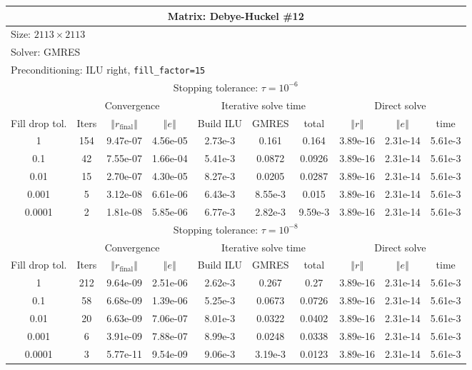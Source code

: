 \documentclass[oneside,final]{amsart}  %
\begin{document}
\begin{tabular}{|c|c|c|c|c|c|c|c|c|c|}
\hline
\multicolumn{10}{|c|}{Matrix: Debye-Huckel \#12}\tabularnewline
\hline
  \multicolumn{10}{|l|}{Size: $2113\times2113$}\tabularnewline
\hline
\multicolumn{10}{|l|}{Solver: GMRES}\tabularnewline
\hline
\multicolumn{10}{|l|}{Preconditioning: ILU right, \texttt{fill\_factor=15}}\tabularnewline
\hline
\hline
\multicolumn{10}{|c|}{Stopping tolerance: $\tau=10^{-6}$}\tabularnewline
\hline
\hline
 & \multicolumn{3}{c|}{Convergence} & \multicolumn{3}{c|}{Iterative solve time} & \multicolumn{3}{c|}{Direct solve}\tabularnewline
\hline
Fill drop tol.  & Iters & $\left\Vert r_{\text{final}}\right\Vert $  & $\left\Vert e\right\Vert $  & Build ILU  & GMRES  & total  & $\left\Vert r\right\Vert $ & $\left\Vert e\right\Vert $  & time\tabularnewline
\hline
1      & 154 & 9.47e-07 & 4.56e-05 & 2.73e-3 &   0.161 &   0.164 & 3.89e-16 & 2.31e-14 &   5.61e-3\\
  \hline
0.1    & 42  & 7.55e-07 & 1.66e-04 & 5.41e-3 &  0.0872 &  0.0926 & 3.89e-16 & 2.31e-14 &   5.61e-3\\
  \hline
0.01   & 15  & 2.70e-07 & 4.30e-05 & 8.27e-3 &  0.0205 &  0.0287 & 3.89e-16 & 2.31e-14 &   5.61e-3\\
  \hline
0.001  & 5   & 3.12e-08 & 6.61e-06 & 6.43e-3 & 8.55e-3 &   0.015 & 3.89e-16 & 2.31e-14 &   5.61e-3\\
  \hline
0.0001 & 2   & 1.81e-08 & 5.85e-06 & 6.77e-3 & 2.82e-3 & 9.59e-3 & 3.89e-16 & 2.31e-14 &   5.61e-3\\
  \hline
\hline
\multicolumn{10}{|c|}{Stopping tolerance: $\tau=10^{-8}$}\tabularnewline
\hline
\hline
 & \multicolumn{3}{c|}{Convergence} & \multicolumn{3}{c|}{Iterative solve time} & \multicolumn{3}{c|}{Direct solve }\tabularnewline
\hline
Fill drop tol.  & Iters  & $\left\Vert r_{\text{final}}\right\Vert $  & $\left\Vert e\right\Vert $ & Build ILU  & GMRES  & total  & $\left\Vert r\right\Vert $  & $\left\Vert e\right\Vert $  & time\tabularnewline
\hline
1      & 212 & 9.64e-09 & 2.51e-06 & 2.62e-3 &   0.267 &    0.27 & 3.89e-16 & 2.31e-14 &   5.61e-3\\
  \hline
0.1    & 58  & 6.68e-09 & 1.39e-06 & 5.25e-3 &  0.0673 &  0.0726 & 3.89e-16 & 2.31e-14 &   5.61e-3\\
  \hline
0.01   & 20  & 6.63e-09 & 7.06e-07 & 8.01e-3 &  0.0322 &  0.0402 & 3.89e-16 & 2.31e-14 &   5.61e-3\\
  \hline
0.001  & 6   & 3.91e-09 & 7.88e-07 & 8.99e-3 &  0.0248 &  0.0338 & 3.89e-16 & 2.31e-14 &   5.61e-3\\
  \hline
0.0001 & 3   & 5.77e-11 & 9.54e-09 & 9.06e-3 & 3.19e-3 &  0.0123 & 3.89e-16 & 2.31e-14 &   5.61e-3\\
  \hline
\end{tabular}
\end{document}
